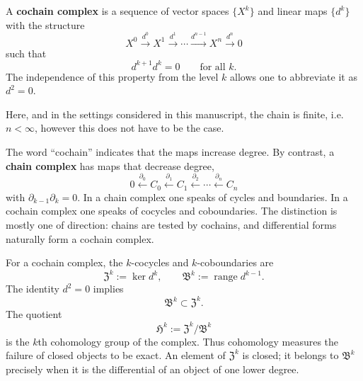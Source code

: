 \documentclass{article}
\DeclareMathOperator{\grad}{grad}
\DeclareMathOperator{\curl}{curl}
\DeclareMathOperator{\divergence}{div}
\newcommand{\f}[1]{\mathfrak{#1}}
\newcommand{\keyterm}[2][]{\textbf{#2}}
\newcommand{\R} {\mathbb R}
\begin{document}
A \keyterm{cochain complex} is a
sequence of vector spaces $\{X^k\}$ and linear maps $\{d^k\}$ with the structure
\[	 X^0
	\xrightarrow{d^0}
	X^1
	\xrightarrow{d^1}
	\cdots
	\xrightarrow{d^{n-1}}
	X^n
	\xrightarrow{d^{n}}
	 0
\]
such that
\[
d^{k+1} d^k = 0
	\qquad \text{for all } k.
\]
The independence of this property from the level $k$ allows one to abbreviate it as $d^2=0$. 

Here, and in the settings considered in this manuscript, the chain is finite, i.e. $n<\infty$, however this does not have to be the case.

 The word ``cochain'' indicates
that the maps increase degree.  By contrast, a \keyterm{chain complex} has maps
that decrease degree,
\[
	0
	\xleftarrow{\partial_0}
 C_0
	\xleftarrow{\partial_1}
	C_1
	\xleftarrow{\partial_2}
	\cdots
	\xleftarrow{\partial_n}
	C_n
\]
with $\partial_{k-1}\partial_k=0$.  In a chain complex one speaks of cycles and
boundaries.  In a cochain complex one speaks of cocycles and coboundaries.  The
distinction is mostly one of direction: chains are tested by cochains, and
differential forms naturally form a cochain complex.

For a cochain complex, the $k$-cocycles and
$k$-coboundaries are
\[	\f Z^k
	:=
	\ker d^k,
	\qquad
	\f B^k
	:=
	\operatorname{range} d^{k-1}.
\]
The identity $d^2=0$ implies
\[
\f B^k \subset \f Z^k.
\]
The quotient
\[	\f H^k
	:=
	\f Z^k/\f B^k
\]
is the $k$th cohomology group of the complex.  Thus cohomology measures the
failure of closed objects to be exact.  An element of $\f Z^k$ is closed; it belongs
to $\f B^k$ precisely when it is the differential of an object of one lower degree.



\end{document}
